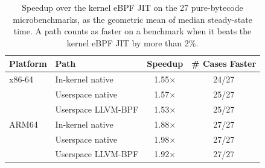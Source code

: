 \begin{table}[t]
\centering
\small
\caption{Speedup over the kernel eBPF JIT on the 27 pure-bytecode microbenchmarks, as the geometric mean of median steady-state time. A path counts as faster on a benchmark when it beats the kernel eBPF JIT by more than 2\%.}
\label{tab:char-micro-summary}
\begin{tabular}{@{}llcc@{}}
\toprule
Platform & Path & Speedup & \# Cases Faster \\
\midrule
x86-64 & In-kernel native   & 1.55$\times$ & 24/27 \\
       & Userspace native   & 1.57$\times$ & 25/27 \\
       & Userspace LLVM-BPF & 1.53$\times$ & 25/27 \\
\midrule
ARM64  & In-kernel native   & 1.88$\times$ & 27/27 \\
       & Userspace native   & 1.98$\times$ & 27/27 \\
       & Userspace LLVM-BPF & 1.92$\times$ & 27/27 \\
\bottomrule
\end{tabular}
\end{table}
